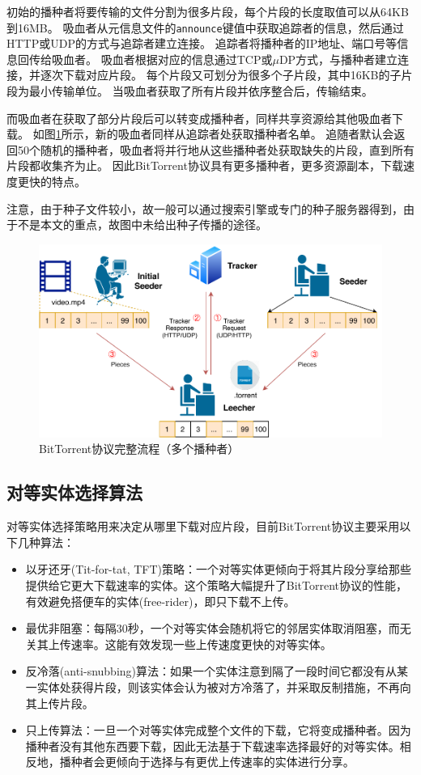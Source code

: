 \documentclass[thesis]{thesis}
\begin{document}
初始的播种者将要传输的文件分割为很多片段，每个片段的长度取值可以从64KB到16MB。
吸血者从元信息文件的\verb'announce'键值中获取追踪者的信息，然后通过HTTP或UDP的方式与追踪者建立连接。
追踪者将播种者的IP地址、端口号等信息回传给吸血者。
吸血者根据对应的信息通过TCP或$\mu$DP方式，与播种者建立连接，并逐次下载对应片段。
每个片段又可划分为很多个子片段，其中16KB的子片段为最小传输单位。
当吸血者获取了所有片段并依序整合后，传输结束。

而吸血者在获取了部分片段后可以转变成播种者，同样共享资源给其他吸血者下载。
如图\ref{fig:overview-2}所示，新的吸血者同样从追踪者处获取播种者名单。
追随者默认会返回50个随机的播种者，吸血者将并行地从这些播种者处获取缺失的片段，直到所有片段都收集齐为止。
因此BitTorrent协议具有更多播种者，更多资源副本，下载速度更快的特点。

注意，由于种子文件较小，故一般可以通过搜索引擎或专门的种子服务器得到，由于不是本文的重点，故图中未给出种子传播的途径。
\begin{figure}[htbp]
\centering
\includegraphics[width=0.8\linewidth]{fig/BitTorrent-BitTorrent-2.pdf}
\caption{BitTorrent协议完整流程（多个播种者）}
\label{fig:overview-2}
\end{figure}

\subsection{对等实体选择算法}
\label{sub:peer_alg}
对等实体选择策略用来决定从哪里下载对应片段，目前BitTorrent协议主要采用以下几种算法\cite{survey_bt}：
\begin{itemize}
	\item 以牙还牙(Tit-for-tat, TFT)策略：一个对等实体更倾向于将其片段分享给那些提供给它更大下载速率的实体。这个策略大幅提升了BitTorrent协议的性能，有效避免搭便车的实体(free-rider)，即只下载不上传。
	\item 最优非阻塞：每隔30秒，一个对等实体会随机将它的邻居实体取消阻塞，而无关其上传速率。这能有效发现一些上传速度更快的对等实体。
	\item 反冷落(anti-snubbing)算法：如果一个实体注意到隔了一段时间它都没有从某一实体处获得片段，则该实体会认为被对方冷落了，并采取反制措施，不再向其上传片段。
	\item 只上传算法：一旦一个对等实体完成整个文件的下载，它将变成播种者。因为播种者没有其他东西要下载，因此无法基于下载速率选择最好的对等实体。相反地，播种者会更倾向于选择与有更优上传速率的实体进行分享。
\end{itemize}
\end{document}
